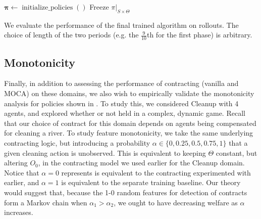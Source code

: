 \documentclass[referee,sn-basic]{sn-jnl}
\theoremstyle{thmstyleone}%
\theoremstyle{thmstyletwo}%
\theoremstyle{thmstylethree}%
\begin{document}
\begin{algorithm}
\caption{Multi-Objective Contract-Augmentation Learning (MOCA)}\label{alg:pseudocode}
$\boldsymbol\pi\leftarrow \operatorname{initialize\_policies}()$\;
Freeze $\pi|_{S \times \Theta}$\;
\Return{$\boldsymbol\pi$}\;
\end{algorithm}
We evaluate the performance of the final trained algorithm on rollouts. The choice of length of the two periods (e.g. the $\frac{9}{10}$th for the first phase) is arbitrary.

\subsection{Monotonicity}
Finally, in addition to assessing the performance of contracting (vanilla and MOCA) on these domains, we also wish to empirically validate the monotonicity analysis for policies shown in . To study this, we considered Cleanup with 4 agents, and explored whether or not  held in a complex, dynamic game. Recall that our choice of contract for this domain depends on agents being compensated for cleaning a river. To study feature monotonicity, we take the same underlying contracting logic, but introducing a probability $\alpha \in \{0,0.25,0.5, 0.75, 1\}$ that a given cleaning action is unobserved. This is equivalent to keeping $\Theta$ constant, but altering $O_0$, in the contracting model we used earlier for the Cleanup domain. Notice that $\alpha = 0$ represents is equivalent to the contracting experimented with earlier, and $\alpha=1$ is equivalent to the separate training baseline. Our theory would suggest that, because the 1-0 random features for detection of contracts form a Markov chain when $\alpha_1 > \alpha_2$, we ought to have decreasing welfare as $\alpha$ increases. 
\end{document}
